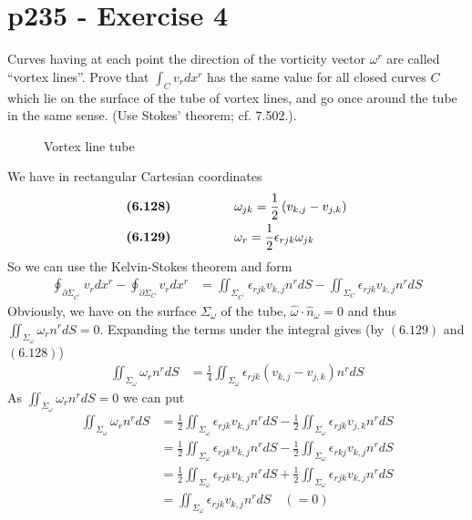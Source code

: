 \section{p235 - Exercise 4}
\begin{tcolorbox}
Curves having at each point the direction of the vorticity vector $\omega^r$ are called ``vortex lines''. Prove that $\int_{C} v_rdx^r$ has the same value for all closed curves $C$ which lie on the surface of the tube of vortex lines, and go once around the tube in the same sense. (Use Stokes' theorem; cf. 7.502.).
\end{tcolorbox}
\begin{figure}[H]%
    \centering

\caption{Vortex line tube }
\label{fig:fig_p2235}
\end{figure}
We have in rectangular Cartesian coordinates
\begin{align}
\textbf{(6.128)}\quad\quad\quad\quad\quad &\omega_{jk}=\frac{1}{2}\left(v_{k,j}-v_{j,k}\right)\\
\textbf{(6.129)}\quad\quad\quad\quad\quad &\omega_r=\frac{1}{2}\epsilon_{rjk}\omega_{jk}
\end{align}
So we can use the Kelvin-Stokes theorem and form
\begin{align}
\oint_{\partial\Sigma_{C^{'}}} {v_rdx^r }-\oint_{\partial\Sigma_{C}} v_rdx^r&= \iint_{\Sigma_{C^{'}}}\epsilon_{rjk}v_{k,j}n^rdS-\iint_{\Sigma_{C}}\epsilon_{rjk}v_{k,j}n^rdS
\end{align}
Obviously, we have on the surface $\Sigma_{\omega}$ of the tube,  $\hat{\omega}\cdot\hat{n}_{\omega}=0$ and thus $\iint_{\Sigma_{\omega}}\omega_rn^rdS=0$.
Expanding the terms under the integral gives (by $(6.129)$ and $(6.128)$)
\begin{align}
\iint_{\Sigma_{\omega}}\omega_rn^rdS&=\frac{1}{4}\iint_{\Sigma_{\omega}}\epsilon_{rjk}\left(v_{k,j}-v_{j,k}\right)n^rdS
\end{align}
As $\iint_{\Sigma_{\omega}}\omega_rn^rdS=0$ we can put 
\begin{align}
\iint_{\Sigma_{\omega}}\omega_rn^rdS&=\frac{1}{2}\iint_{\Sigma_{\omega}}\epsilon_{rjk}v_{k,j}n^rdS-\frac{1}{2}\iint_{\Sigma_{\omega}}\epsilon_{rjk}v_{j,k}n^rdS\\
&=\frac{1}{2}\iint_{\Sigma_{\omega}}\epsilon_{rjk}v_{k,j}n^rdS-\frac{1}{2}\iint_{\Sigma_{\omega}}\epsilon_{rkj}v_{k,j}n^rdS\\
&=\frac{1}{2}\iint_{\Sigma_{\omega}}\epsilon_{rjk}v_{k,j}n^rdS+\frac{1}{2}\iint_{\Sigma_{\omega}}\epsilon_{rjk}v_{k,j}n^rdS\\
&=\iint_{\Sigma_{\omega}}\epsilon_{rjk}v_{k,j}n^rdS\quad\left(=0\right)
\end{align}

